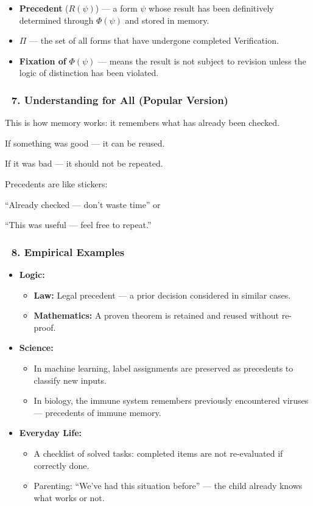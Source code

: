 \documentclass[12pt]{article}
\begin{document}
\begin{itemize}
\item \textbf{Precedent} ($R(\psi)$) — a form $\psi$ whose result has been definitively determined through $\Phi(\psi)$ and stored in memory.
\item $\Pi$ — the set of all forms that have undergone completed Verification.
\item \textbf{Fixation of} $\Phi(\psi)$ — means the result is not subject to revision unless the logic of distinction has been violated.
\end{itemize}

\subsubsection*{🔹 7. Understanding for All (Popular Version)}

This is how memory works: it remembers what has already been checked.

If something was good — it can be reused.

If it was bad — it should not be repeated.

Precedents are like stickers:

``Already checked — don’t waste time'' or

``This was useful — feel free to repeat.''

\subsubsection*{🔹 8. Empirical Examples}

\begin{itemize}
\item \textbf{Logic:} 
\begin{itemize}
\item \textbf{Law:} Legal precedent — a prior decision considered in similar cases.
\item \textbf{Mathematics:} A proven theorem is retained and reused without re-proof.
\end{itemize}
\item \textbf{Science:}
\begin{itemize}
\item In machine learning, label assignments are preserved as precedents to classify new inputs.
\item In biology, the immune system remembers previously encountered viruses — precedents of immune memory.
\end{itemize}
\item \textbf{Everyday Life:}
\begin{itemize}
\item A checklist of solved tasks: completed items are not re-evaluated if correctly done.
\item Parenting: ``We’ve had this situation before'' — the child already knows what works or not.
\end{itemize}
\end{itemize}
\end{document}
